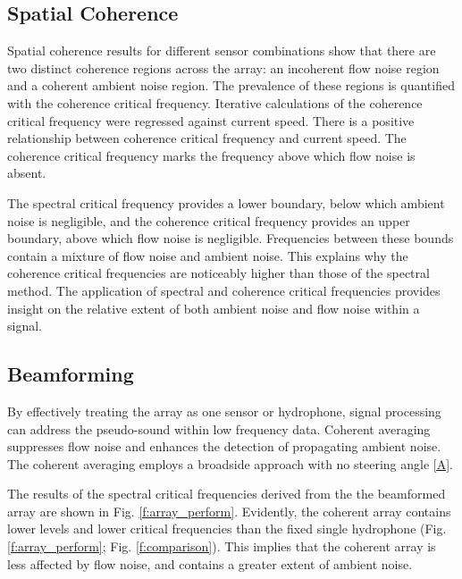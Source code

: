 \documentclass[12pt,journal,onecolumn]{IEEEtran}
\begin{document}
\subsection{Spatial Coherence}
Spatial coherence results for different sensor combinations show that there are two distinct coherence regions across the array: an incoherent flow noise region and a coherent ambient noise region. The prevalence of these regions is quantified with the coherence critical frequency. 
Iterative calculations of the coherence critical frequency were regressed against current speed. There is a positive relationship between coherence critical frequency and current speed. The coherence critical frequency marks the frequency above which flow noise is absent. 

The spectral critical frequency provides a lower boundary, below which ambient noise is negligible, and the coherence critical frequency provides an upper boundary, above which flow noise is negligible. Frequencies between these bounds contain a mixture of flow noise and ambient noise. This explains why the coherence critical frequencies are noticeably higher than those of the spectral method. The application of spectral and coherence critical frequencies provides insight on the relative extent of both ambient noise and flow noise within a signal. 



\subsection{Beamforming}
 By effectively treating the array as one sensor or hydrophone, signal processing can address the pseudo-sound within low frequency data. 
Coherent averaging suppresses flow noise and enhances the detection of propagating ambient noise. The coherent averaging employs a broadside approach with no steering angle \eqref{A}. 

The results of the spectral critical frequencies derived from the the beamformed array are shown in Fig. \ref{f:array_perform}. Evidently, the coherent array contains lower levels and lower critical frequencies than the fixed single hydrophone (Fig. \ref{f:array_perform}; Fig. \ref{f:comparison}). This implies that the coherent array is less affected by flow noise, and contains a greater extent of ambient noise. 

\end{document}
